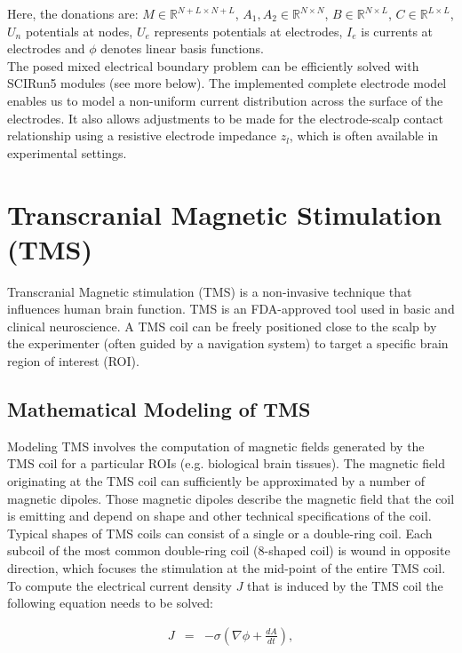 \documentclass[fleqn,11pt,openany]{book}
\begin{document}
Here, the donations are: $M \in \mathbb{R}^{N+L \times N+L}$, $A_{1},A_{2} \in \mathbb{R}^{N \times N}$, $B \in \mathbb{R}^{N \times L}$, $C \in \mathbb{R}^{L \times L}$, $U_n$ potentials at nodes, $U_e$ represents potentials at electrodes, $I_{e}$ is currents at electrodes and $\phi$ denotes linear basis functions. \\

The posed mixed electrical boundary problem can be efficiently solved with SCIRun5 modules (see more below).
The implemented complete electrode model enables us to model a non-uniform current distribution across the surface of the electrodes. It also allows adjustments to be made for the electrode-scalp contact relationship using a resistive electrode impedance $z_{l}$, which is often available in experimental settings.

\section{Transcranial Magnetic Stimulation (TMS)}

Transcranial Magnetic stimulation (TMS) is a non-invasive technique that influences human brain function. TMS is an FDA-approved tool used in basic and clinical neuroscience.
A TMS coil can be freely positioned close to the scalp by the experimenter (often guided by a navigation system) to target a specific brain region of interest (ROI).

\subsection{Mathematical Modeling  of TMS}

Modeling TMS involves the computation of magnetic fields generated by the TMS coil for a particular ROIs (e.g. biological brain tissues).
The magnetic field originating at the TMS coil can sufficiently be approximated by a number of magnetic dipoles. Those magnetic dipoles describe the magnetic field
that the coil is emitting and depend on shape and other technical specifications of the coil. Typical shapes of TMS coils can consist of a single or a double-ring
coil. Each subcoil of the most common double-ring coil (8-shaped coil) is wound in opposite direction, which focuses the stimulation at the mid-point of the entire
TMS coil. To compute the electrical current density $J$ that is induced by the TMS coil the following equation needs to be solved:

\begin{center}
	\begin{eqnarray*}
		J &=& -\sigma (\nabla{\phi} + \frac{dA}{dt}),
	\end{eqnarray*}
\end{center}
\end{document}
